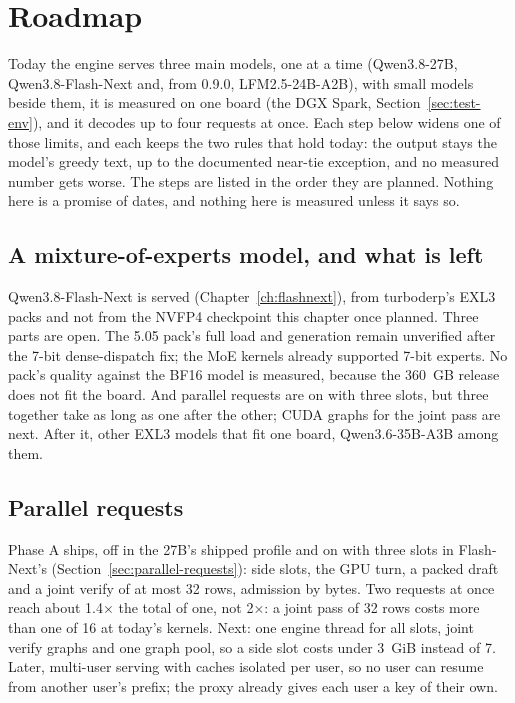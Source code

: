 \chapter{Roadmap}\label{ch:roadmap}

Today the engine serves three main models, one at a time (Qwen3.8-27B, Qwen3.8-Flash-Next and, from 0.9.0, LFM2.5-24B-A2B), with small models beside them, it is measured on one board (the DGX Spark, Section~\ref{sec:test-env}), and it decodes up to four requests at once. Each step below widens one of those limits, and each keeps the two rules that hold today: the output stays the model's greedy text, up to the documented near-tie exception, and no measured number gets worse. The steps are listed in the order they are planned. Nothing here is a promise of dates, and nothing here is measured unless it says so.

\section{A mixture-of-experts model, and what is left}

Qwen3.8-Flash-Next is served (Chapter~\ref{ch:flashnext}), from turboderp's EXL3 packs and not from the NVFP4 checkpoint this chapter once planned. Three parts are open. The 5.05 pack's full load and generation remain unverified after the 7-bit dense-dispatch fix; the MoE kernels already supported 7-bit experts. No pack's quality against the BF16 model is measured, because the 360~GB release does not fit the board. And parallel requests are on with three slots, but three together take as long as one after the other; CUDA graphs for the joint pass are next. After it, other EXL3 models that fit one board, Qwen3.6-35B-A3B among them.

\section{Parallel requests}

Phase A ships, off in the 27B's shipped profile and on with three slots in Flash-Next's (Section~\ref{sec:parallel-requests}): side slots, the GPU turn, a packed draft and a joint verify of at most 32 rows, admission by bytes. Two requests at once reach about 1.4$\times$ the total of one, not 2$\times$: a joint pass of 32 rows costs more than one of 16 at today's kernels. Next: one engine thread for all slots, joint verify graphs and one graph pool, so a side slot costs under 3~GiB instead of 7. Later, multi-user serving with caches isolated per user, so no user can resume from another user's prefix; the proxy already gives each user a key of their own.

